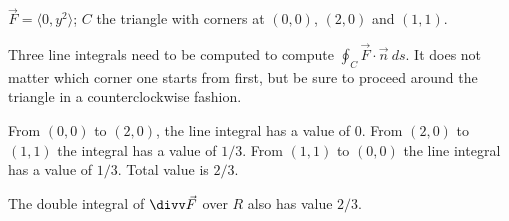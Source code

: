 {$\vec F = \langle 0,y^2\rangle$; $C$ the triangle with corners at $(0,0)$, $(2,0)$ and $(1,1)$.
}
{Three line integrals need to be computed to compute $\oint_C \vec F\cdot \vec n\ ds$. It does not matter which corner one starts from first, but be sure to proceed around the triangle in a counterclockwise fashion.

From $(0,0)$ to $(2,0)$, the line integral has a value of 0. From $(2,0)$ to $(1,1)$ the integral has a value of $1/3$. From $(1,1)$ to $(0,0)$ the line integral has a value of $1/3$. Total value is $2/3$.

The double integral of $\divv\vec F$ over $R$ also has value $2/3$.
}
